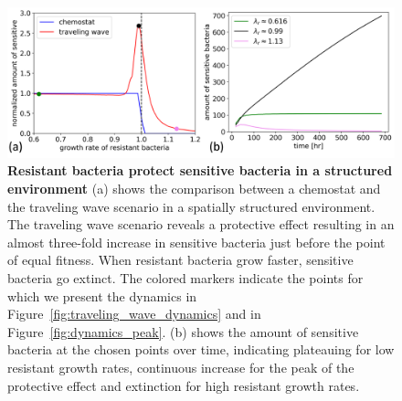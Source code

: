 \begin{figure}
\centering
\includegraphics[width=\linewidth]{graphics/2025_09_30_phages_fig5.png}
\caption{\textbf{Resistant bacteria protect sensitive bacteria in a structured environment} (a) shows the comparison between a chemostat and the traveling wave scenario in a spatially structured environment. The traveling wave scenario reveals a protective effect resulting in an almost three-fold increase in sensitive bacteria just before the point of equal fitness. When resistant bacteria grow faster, sensitive bacteria go extinct. The colored markers indicate the points for which we present the dynamics in Figure~\ref{fig:traveling_wave_dynamics} and in Figure~\ref{fig:dynamics_peak}. (b) shows the amount of sensitive bacteria at the chosen points over time, indicating plateauing for low resistant growth rates, continuous increase for the peak of the protective effect and extinction for high resistant growth rates.}
\label{fig:protective_effect}
\end{figure}

